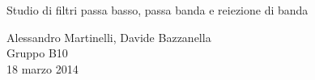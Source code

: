 \begin{center}

     	{\huge Studio di filtri passa basso, passa banda e reiezione di banda}

     	\vspace{0.2cm}
	\vspace{0.3cm}

      	{\large Alessandro Martinelli, Davide Bazzanella} \\
		{ Gruppo B10} \\
	
	\vspace{0.1cm}
      	{ 18 marzo 2014}

\end{center}
